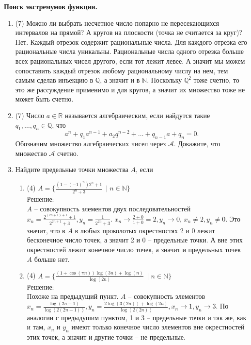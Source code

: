 \documentclass[a4paper]{article}
\begin{document}
\noindent\textbf{Поиск экстремумов функции.}

\begin{enumerate}
	\item (7) Можно ли выбрать несчетное число попарно не пересекающихся интервалов на прямой? А кругов на плоскости (точка не считается за круг)?\\
Нет. Каждый отрезок содержит рациональные числа. Для каждого отрезка его рациональные числа уникальны. Рациональные числа одного отрезка больше всех рациональных чисел другого, если тот лежит левее. А значит мы можем сопоставить каждый отрезок любому рациональному числу на нем, тем самым сделав инъекцию в $\mathbb Q$, а значит и в $\mathbb N$. Поскольку $\mathbb Q^2$ тоже счетно, то это же рассуждение применимо и для кругов, а значит их множество тоже не может быть счетно. 
	\item (7) Число $a\in \mathbb R$ называется алгебраическим, если найдутся такие $q_1,\dots,q_n\in \mathbb Q$, что
	\[
	    a^n + q_1a^{n-1} + a_2q^{n-2} + \dots + q_{n-1}a + q_n = 0.
	\]
	Обозначим множество алгебраических чисел через $\mathcal{A}$. Докажите, что множество $\mathcal{A}$ счетно.
	
	\item Найдите предельные точки множества $A$, если
	\begin{enumerate}
	    \item (4) $A = \{\frac{(1 - (-1)^n)2^n + 1}{2^n + 3}\ \mid n\in \mathbb N\}$\\
    Решение:\\
        $A$ -- совокупность элементов двух последовательностей $x_n = \frac{2^{(2n + 1)+1} + 1}{2^{2n+1} + 3}, y_n = \frac{1}{2^{2n} + 3}$. $x_n \rightarrow \frac{2 + 0}{1 + 0} = 2, y_n \rightarrow 0$, $x_n \neq 2, y_n \neq 0$. Это значит, что в $A$ в любых проколотых окрестностях 2 и 0 лежит бесконечное число точек, а значит 2 и 0 -- предельные точки. А вне этих окрестностей лежит конечное число точек, а значит и предельных точек $A$ больше нет.
        \item (4) $A = \{\frac{(1 + \cos (\pi n)) \log (3n) + \log(n)}{\log (2n)}\ \mid n\in \mathbb N\}$\\
    Решение:\\
    Похоже на предыдущий пункт. $A$ -- совокупность элементов $x_n = \frac{\log(2n+1)}{\log(2(2n+1))}, y_n = \frac{2\log(3(2n)) + \log(2n)}{\log(2(2n))}, x_n \rightarrow 1, y_n \rightarrow 3$. По аналогии с предыдушим пунктом, 1 и 3 -- предельные точки и так же, как и там, $x_n$ и $y_n$ имеют только конечное число элементов вне окрестностей этих точек, а значит и другие точки -- не предельные.
	\end{enumerate}
	

\end{enumerate}
\end{document}
